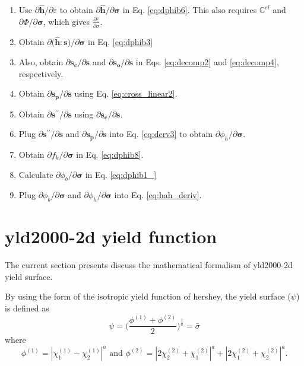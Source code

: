 \documentclass[12pt]{amsart}
\begin{document}
\begin{enumerate}
\item Use $\partial \hat{\mathbf{h}}/\partial \bar{\varepsilon}$ to obtain $\partial \hat{\mathbf{h}}/\partial \mathbf{\sigma}$ in Eq. \ref{eq:dphib6}. This also requires $\mathbb{C}^{el}$ and $\partial\Phi/\partial\mathbf{\sigma}$, which gives $\frac{\partial\bar{\varepsilon}}{\partial\sigma}$.
\item Obtain $\partial\big(\hat{\mathbf{h}}:\mathbf{s}\big)/\partial \mathbf{\sigma}$ in Eq. \ref{eq:dphib3}
\item Also, obtain $\partial \mathbf{s_c}/\partial \mathbf{s}$ and $\partial \mathbf{s_o}/\partial\mathbf{s}$ in Eqs. \ref{eq:decomp2} and \ref{eq:decomp4}, respectively.
\item Obtain $\partial \mathbf{s_p}/\partial\mathbf{s}$ using Eq. \ref{eq:cross_linear2}.
\item Obtain $\partial\mathbf{s}^{\prime\prime}/\partial\mathbf{s}$ using $\partial \mathbf{s_c}/\partial \mathbf{s}$.
\item Plug $\partial\mathbf{s}^{\prime\prime}/\partial\mathbf{s}$ and  $\partial \mathbf{s_p}/\partial\mathbf{s}$ into Eq. \ref{eq:derv3} to obtain $\partial\phi_h/\partial\mathbf{\sigma}$.
\item Obtain $\partial f_k/\partial \mathbf{\sigma}$ in Eq. \ref{eq:dphib8}.
\item Calculate $\partial \phi_b/\partial \mathbf{\sigma}$ in Eq. \ref{eq:dphib1_}
\item Plug $\partial \phi_b/\partial\mathbf{\sigma}$ and $\partial\phi_h/\partial\mathbf{\sigma}$ into Eq. \ref{eq:hah_deriv}.
\end{enumerate}
\newpage
\section{yld2000-2d yield function}
The current section presents discuss the mathematical formalism of yld2000-2d yield surface.

By using the form of the isotropic yield function of hershey, the yield surface ($\psi$) is defined as
\begin{equation}
  \label{eq:hershey}
  \psi=\bigg(\frac{\phi^{(1)} + \phi^{(2)}}{2}\bigg)^{\frac{1}{a}}=\bar{\sigma}
\end{equation}
where
\begin{equation}
  \label{eq:hershey2}
  \phi^{(1)} = |\chi^{(1)}_1-\chi^{(1)}_2|^a \text{ and } \phi^{(2)}=|2\chi^{(2)}_2+\chi^{(2)}_1|^a+|2\chi^{(2)}_1+\chi^{(2)}_2|^a.
\end{equation}
\end{document}
